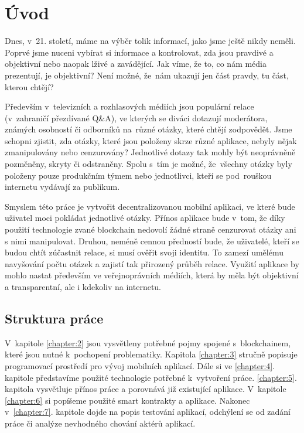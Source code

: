 %
\chapter{Úvod}
\label{chapter:1}
Dnes, v~21. století, máme na výběr tolik informací, jako jsme ještě nikdy neměli. Poprvé jsme nuceni vybírat si informace a kontrolovat, zda jsou pravdivé a objektivní nebo naopak lživé a zavádějící. Jak víme, že to, co nám média prezentují, je objektivní? Není možné, že~nám ukazují jen část pravdy, tu část, kterou chtějí?

Především v~televizních a rozhlasových médiích jsou populární relace (v~zahraničí přezdívané Q\&A), ve kterých se diváci dotazují moderátora, známých osobností či odborníků na~různé otázky, které chtějí zodpovědět. Jsme schopni zjistit, zda otázky, které jsou položeny skrze různé aplikace, nebyly nějak zmanipulovány nebo cenzurovány? Jednotlivé dotazy tak mohly být neoprávněně pozměněny, skryty či odstraněny. Spolu s~tím je možné, že~všechny otázky byly položeny pouze produkčním týmem nebo jednotlivci, kteří se pod~rouškou internetu vydávají za  publikum.

Smyslem této práce je vytvořit decentralizovanou mobilní aplikaci, ve které bude uživatel moci pokládat jednotlivé otázky. Přínos aplikace bude v~tom, že díky použití technologie zvané blockchain nedovolí žádné straně cenzurovat otázky ani s nimi manipulovat. Druhou, neméně cennou předností bude, že uživatelé, kteří se budou chtít zúčastnit relace, si musí ověřit svoji identitu. To zamezí umělému navyšování počtu otázek a zajistí tak přirozený průběh relace. Využití aplikace by mohlo nastat především ve veřejnoprávních médiích, která by měla být objektivní a transparentní, ale i kdekoliv na internetu. 

\section{Struktura práce}
V~kapitole \ref{chapter:2} jsou vysvětleny potřebné pojmy spojené s~blockchainem, které jsou nutné k~pochopení problematiky. Kapitola \ref{chapter:3} stručně popisuje programovací prostředí pro vývoj mobilních aplikací. Dále si ve \ref{chapter:4}. kapitole představíme použité technologie potřebné k~vytvoření práce. \ref{chapter:5}. kapitola vysvětluje přínos práce a porovnává již existující aplikace. V~kapitole \ref{chapter:6} si popíšeme použité smart kontrakty a aplikace. Nakonec v~\ref{chapter:7}. kapitole dojde na popis testování aplikací, odchýlení se od zadání práce či analýze nevhodného chování aktérů aplikací. 

